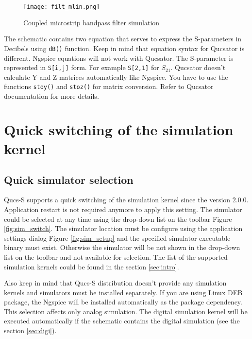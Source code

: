     \begin{figure}[!ht]
    \begin{center}
        \texttt{[image: filt\_mlin.png]}
    \end{center}
    \caption{Coupled microstrip bandpass filter simulation} \label{fig:mlin}
    \end{figure}

The schematic contains two equation that serves to express the S-parameters in Decibels using \verb|dB()| function. Keep in mind that equation syntax for Qucsator is different. Ngspice equations will not work with Qucsator. The S-parameter is represented in \verb|S[i,j]| form. For example \verb|S[2,1]| for $S_{21}$. Qucsator doesn't calculate Y and Z matrices automatically like Ngspice. You have to use the functions \verb|stoy()| and \verb|stoz()| for matrix conversion. Refer to Qucsator documentation for more details.

\section{Quick switching of the simulation kernel} \label{sec:quick_sw}

\subsection{Quick simulator selection}

Qucs-S supports a quick switching of the simulation kernel since the version 2.0.0. Application restart is not required anymore to apply this setting. The simulator could be selected at any time using the drop-down list on the toolbar Figure \ref{fig:sim_switch}. The simulator location must be configure using the application settings dialog Figure \ref{fig:sim_setup} and the specified simulator executable binary must exist. Otherwise the simulator will be not shown in the drop-down list on the toolbar and not available for selection. The list of the supported simulation kernels could be found in the section \ref{sec:intro}.

Also keep in mind that Qucs-S distribution doesn't provide any simulation kernels and simulators must be installed separately. If you are using Linux DEB package, the Ngspice will be installed automatically as the package dependency. This selection affects only analog simulation. The digital simulation kernel will be executed automatically if the schematic contains the digital simulation (see the section \ref{sec:digi}).

